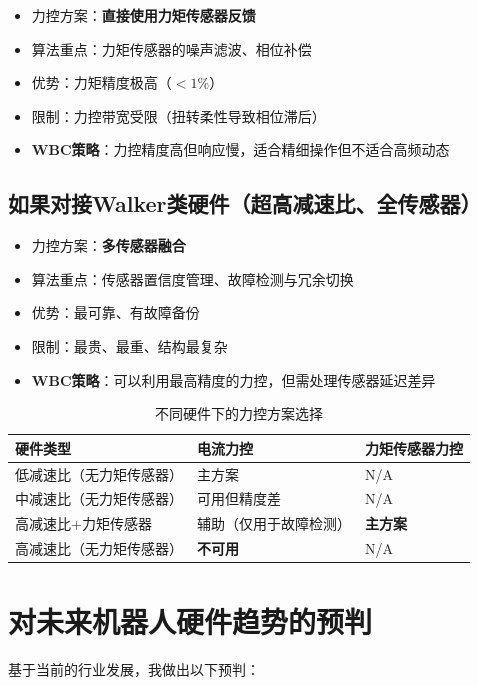 \begin{itemize}
  \item 力控方案：\textbf{直接使用力矩传感器反馈}
  \item 算法重点：力矩传感器的噪声滤波、相位补偿
  \item 优势：力矩精度极高（$<1\%$）
  \item 限制：力控带宽受限（扭转柔性导致相位滞后）
  \item \textbf{WBC策略}：力控精度高但响应慢，适合精细操作但不适合高频动态
\end{itemize}

\subsection{如果对接Walker类硬件（超高减速比、全传感器）}

\begin{itemize}
  \item 力控方案：\textbf{多传感器融合}
  \item 算法重点：传感器置信度管理、故障检测与冗余切换
  \item 优势：最可靠、有故障备份
  \item 限制：最贵、最重、结构最复杂
  \item \textbf{WBC策略}：可以利用最高精度的力控，但需处理传感器延迟差异
\end{itemize}

\begin{table}[H]
\centering
\begin{tabular}{p{2.5cm}p{4cm}p{4cm}}
\toprule
\textbf{硬件类型} & \textbf{电流力控} & \textbf{力矩传感器力控} \\
\midrule
低减速比（无力矩传感器） & 主方案 & N/A \\
中减速比（无力矩传感器） & 可用但精度差 & N/A \\
高减速比+力矩传感器 & 辅助（仅用于故障检测） & \textbf{主方案} \\
高减速比（无力矩传感器） & \textbf{不可用} & N/A \\
\bottomrule
\end{tabular}
\caption{不同硬件下的力控方案选择}
\label{tab:hw_ctrl_strategy}
\end{table}

\section{对未来机器人硬件趋势的预判}

基于当前的行业发展，我做出以下预判：


